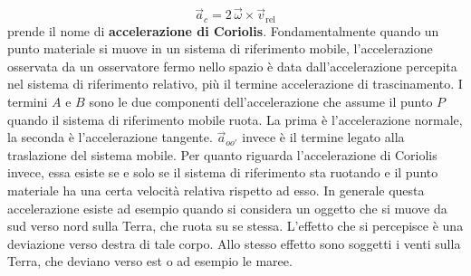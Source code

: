 \documentclass[10pt,a4paper]{book}
\begin{document}
\[
	\vec{a}_c= 2\,\vec{\omega} \times \vec{v}_{\text{rel}}
\]
prende il nome di \textbf{accelerazione di Coriolis}.
Fondamentalmente quando un punto materiale si muove in un sistema di riferimento mobile, l'accelerazione osservata da un osservatore fermo nello spazio è data dall'accelerazione percepita nel sistema di riferimento relativo, più il termine accelerazione di trascinamento.
I termini $A$ e $B$ sono le due componenti dell'accelerazione che assume il punto $P$ quando il sistema di riferimento mobile ruota. La prima è l'accelerazione normale, la seconda è l'accelerazione tangente. $\vec{a}_{oo'}$ invece è il termine legato alla traslazione del sistema mobile.
Per quanto riguarda l'accelerazione di Coriolis invece, essa esiste se e solo se il sistema di riferimento sta ruotando e il punto materiale ha una certa velocità relativa rispetto ad esso. In generale questa accelerazione esiste ad esempio quando si considera un oggetto che si muove da sud verso nord sulla Terra, che ruota su se stessa. L'effetto che si percepisce è una deviazione verso destra di tale corpo. Allo stesso effetto sono soggetti i venti sulla Terra, che deviano verso est o ad esempio le maree.
\end{document}
